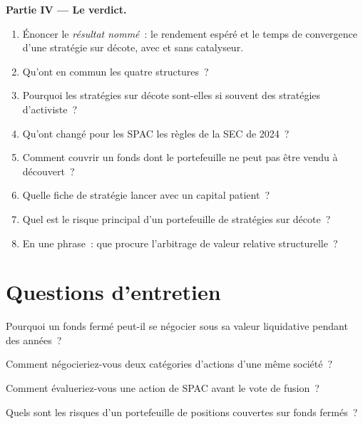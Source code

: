 \begin{problem}
\medskip\noindent\textbf{Partie IV --- Le verdict.}
\begin{enumerate}[resume]
\item Énoncer le \emph{résultat nommé}~: le rendement espéré et le temps de convergence d'une stratégie sur décote, avec et sans catalyseur.
\item Qu'ont en commun les quatre structures~?
\item Pourquoi les stratégies sur décote sont-elles si souvent des stratégies d'activiste~?
\item Qu'ont changé pour les SPAC les règles de la SEC de 2024~?
\item Comment couvrir un fonds dont le portefeuille ne peut pas être vendu à découvert~?
\item Quelle fiche de stratégie lancer avec un capital patient~?
\item Quel est le risque principal d'un portefeuille de stratégies sur décote~?
\item En une phrase~: que procure l'arbitrage de valeur relative structurelle~?
\end{enumerate}
\end{problem}

\section{Questions d'entretien}

\begin{interviewq}\label{iq:s1:share-classes-holding-companies-closed-end-funds-spacs:1}
Pourquoi un fonds fermé peut-il se négocier sous sa valeur liquidative pendant des années~?
\end{interviewq}

\begin{interviewq}\label{iq:s1:share-classes-holding-companies-closed-end-funds-spacs:2}
Comment négocieriez-vous deux catégories d'actions d'une même société~?
\end{interviewq}

\begin{interviewq}\label{iq:s1:share-classes-holding-companies-closed-end-funds-spacs:3}
Comment évalueriez-vous une action de SPAC avant le vote de fusion~?
\end{interviewq}

\begin{interviewq}\label{iq:s1:share-classes-holding-companies-closed-end-funds-spacs:4}
Quels sont les risques d'un portefeuille de positions couvertes sur fonds fermés~?
\end{interviewq}

